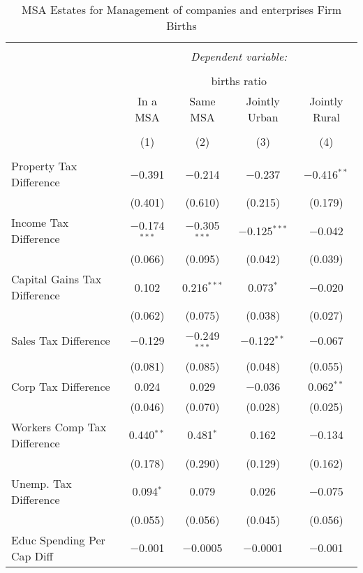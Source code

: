 
\begin{table}[!htbp] \centering 
  \caption{MSA Estates for  Management of companies and enterprises Firm Births} 
  \label{} 
\begin{tabular}{@{\extracolsep{5pt}}lcccc} 
\\[-1.8ex]\hline 
\hline \\[-1.8ex] 
 & \multicolumn{4}{c}{\textit{Dependent variable:}} \\ 
\cline{2-5} 
\\[-1.8ex] & \multicolumn{4}{c}{births ratio} \\ 
 & In a MSA & Same MSA & Jointly Urban & Jointly Rural \\ 
\\[-1.8ex] & (1) & (2) & (3) & (4)\\ 
\hline \\[-1.8ex] 
 Property Tax Difference & $-$0.391 & $-$0.214 & $-$0.237 & $-$0.416$^{**}$ \\ 
  & (0.401) & (0.610) & (0.215) & (0.179) \\ 
  Income Tax Difference & $-$0.174$^{***}$ & $-$0.305$^{***}$ & $-$0.125$^{***}$ & $-$0.042 \\ 
  & (0.066) & (0.095) & (0.042) & (0.039) \\ 
  Capital Gains Tax Difference & 0.102 & 0.216$^{***}$ & 0.073$^{*}$ & $-$0.020 \\ 
  & (0.062) & (0.075) & (0.038) & (0.027) \\ 
  Sales Tax Difference & $-$0.129 & $-$0.249$^{***}$ & $-$0.122$^{**}$ & $-$0.067 \\ 
  & (0.081) & (0.085) & (0.048) & (0.055) \\ 
  Corp Tax Difference & 0.024 & 0.029 & $-$0.036 & 0.062$^{**}$ \\ 
  & (0.046) & (0.070) & (0.028) & (0.025) \\ 
  Workers Comp Tax Difference & 0.440$^{**}$ & 0.481$^{*}$ & 0.162 & $-$0.134 \\ 
  & (0.178) & (0.290) & (0.129) & (0.162) \\ 
  Unemp. Tax Difference & 0.094$^{*}$ & 0.079 & 0.026 & $-$0.075 \\ 
  & (0.055) & (0.056) & (0.045) & (0.056) \\ 
  Educ Spending Per Cap Diff & $-$0.001 & $-$0.0005 & $-$0.0001 & $-$0.001 \\ 

\end{tabular}
\end{table}
